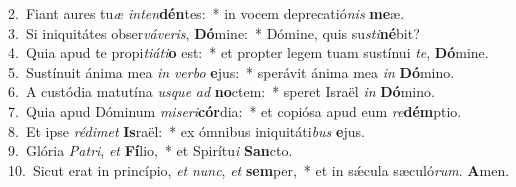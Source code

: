 {2.~}Fiant aures tu\textit{æ} \textit{in}\textit{ten}\textbf{dén}tes:~* in vocem deprecatió\textit{nis} \textbf{me}æ.\\
{3.~}Si iniquitátes obser\textit{vá}\textit{ve}\textit{ris}, \textbf{Dó}mine:~* Dómine, quis su\textit{sti}\textbf{né}bit?\\
{4.~}Quia apud te propi\textit{ti}\textit{á}\textit{ti}\textbf{o} est:~* et propter legem tuam sustínui \textit{te}, \textbf{Dó}mine.\\
{5.~}Sustínuit ánima mea \textit{in} \textit{ver}\textit{bo} \textbf{e}jus:~* sperávit ánima mea \textit{in} \textbf{Dó}mino.\\
{6.~}A custódia matutína \textit{us}\textit{que} \textit{ad} \textbf{no}ctem:~* speret Israël \textit{in} \textbf{Dó}mino.\\
{7.~}Quia apud Dóminum \textit{mi}\textit{se}\textit{ri}\textbf{cór}dia:~* et copiósa apud eum \textit{re}\textbf{dém}ptio.\\
{8.~}Et ipse \textit{ré}\textit{di}\textit{met} \textbf{Is}raël:~* ex ómnibus iniquitáti\textit{bus} \textbf{e}jus.\\
{9.~}Glória \textit{Pa}\textit{tri}, \textit{et} \textbf{Fí}lio,~* et Spirítu\textit{i} \textbf{San}cto.\\
{10.~}Sicut erat in princípio, \textit{et} \textit{nunc}, \textit{et} \textbf{sem}per,~* et in sǽcula sæculó\textit{rum}. \textbf{A}men.\\
